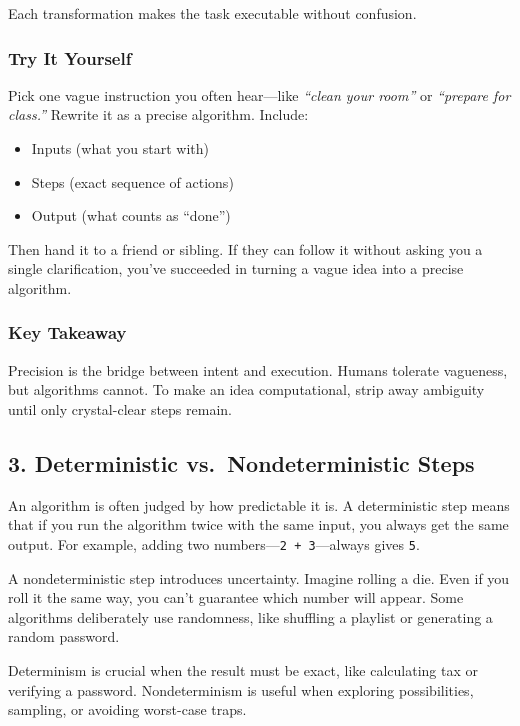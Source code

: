 \documentclass[
  letterpaper,
  DIV=11,
  numbers=noendperiod]{scrreprt}
\providecommand{\tightlist}{%
  \setlength{\itemsep}{0pt}\setlength{\parskip}{0pt}}
\begin{document}
Each transformation makes the task executable without confusion.

\subsubsection{Try It Yourself}\label{try-it-yourself-1}

Pick one vague instruction you often hear---like \emph{``clean your
room''} or \emph{``prepare for class.''} Rewrite it as a precise
algorithm. Include:

\begin{itemize}
\tightlist
\item
  Inputs (what you start with)
\item
  Steps (exact sequence of actions)
\item
  Output (what counts as ``done'')
\end{itemize}

Then hand it to a friend or sibling. If they can follow it without
asking you a single clarification, you've succeeded in turning a vague
idea into a precise algorithm.

\subsubsection{Key Takeaway}\label{key-takeaway}

Precision is the bridge between intent and execution. Humans tolerate
vagueness, but algorithms cannot. To make an idea computational, strip
away ambiguity until only crystal-clear steps remain.

\subsection{3. Deterministic vs.~Nondeterministic
Steps}\label{deterministic-vs.-nondeterministic-steps}

An algorithm is often judged by how predictable it is. A deterministic
step means that if you run the algorithm twice with the same input, you
always get the same output. For example, adding two
numbers---\texttt{2\ +\ 3}---always gives \texttt{5}.

A nondeterministic step introduces uncertainty. Imagine rolling a die.
Even if you roll it the same way, you can't guarantee which number will
appear. Some algorithms deliberately use randomness, like shuffling a
playlist or generating a random password.

Determinism is crucial when the result must be exact, like calculating
tax or verifying a password. Nondeterminism is useful when exploring
possibilities, sampling, or avoiding worst-case traps.
\end{document}
